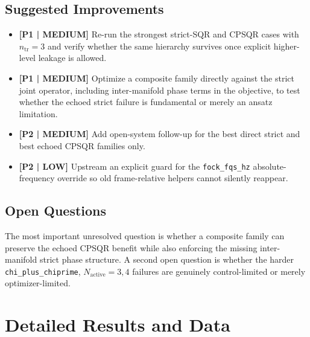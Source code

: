 \documentclass[aps,pra,twocolumn,reprint,floatfix,amsmath,amssymb]{revtex4-2}
\begin{document}
\subsection{Suggested Improvements}
\begin{itemize}
  \item \textbf{[P1 | MEDIUM]} Re-run the strongest strict-SQR and CPSQR cases with $n_{\mathrm{tr}}=3$ and verify whether the same hierarchy survives once explicit higher-level leakage is allowed.
  \item \textbf{[P1 | MEDIUM]} Optimize a composite family directly against the strict joint operator, including inter-manifold phase terms in the objective, to test whether the echoed strict failure is fundamental or merely an ansatz limitation.
  \item \textbf{[P2 | MEDIUM]} Add open-system follow-up for the best direct strict and best echoed CPSQR families only.
  \item \textbf{[P2 | LOW]} Upstream an explicit guard for the \texttt{fock\_fqs\_hz} absolute-frequency override so old frame-relative helpers cannot silently reappear.
\end{itemize}

\subsection{Open Questions}
The most important unresolved question is whether a composite family can preserve the echoed CPSQR benefit while also enforcing the missing inter-manifold strict phase structure. A second open question is whether the harder \texttt{chi\_plus\_chiprime}, $N_{\mathrm{active}}=3,4$ failures are genuinely control-limited or merely optimizer-limited.




\appendix
\section{Detailed Results and Data}
\end{document}
